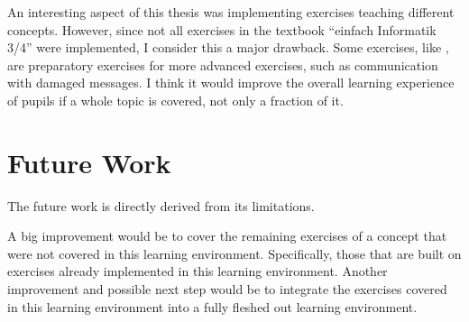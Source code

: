An interesting aspect of this thesis was implementing exercises teaching different concepts. However, since not all exercises in the textbook “einfach Informatik 3/4” were implemented, I consider this a major drawback. Some exercises, like , are preparatory exercises for more advanced exercises, such as communication with damaged messages. I think it would improve the overall learning experience of pupils if a whole topic is covered, not only a fraction of it.

\section{Future Work}
\label{section:futureWork}

The future work is directly derived from its limitations.

A big improvement would be to cover the remaining exercises of a concept that were not covered in this learning environment. Specifically, those that are built on exercises already implemented in this learning environment.
Another improvement and possible next step would be to integrate the exercises covered in this learning environment into a fully fleshed out learning environment. 